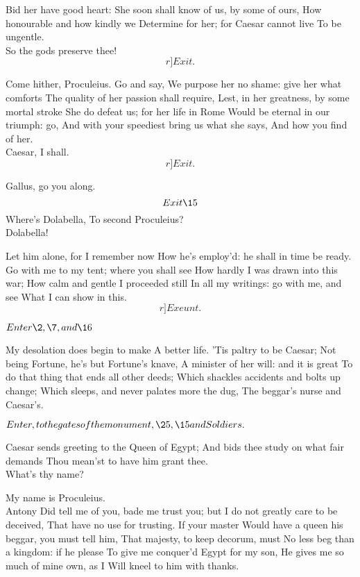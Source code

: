 \documentclass{book}
\begin{document}
\3	Bid her have good heart:
	She soon shall know of us, by some of ours,
	How honourable and how kindly we
	Determine for her; for Caesar cannot live
	To be ungentle. \\

	So the gods preserve thee!  \[r]Exit.\]

\3	Come hither, Proculeius. Go and say,
	We purpose her no shame: give her what comforts
	The quality of her passion shall require,
	Lest, in her greatness, by some mortal stroke
	She do defeat us; for her life in Rome
	Would be eternal in our triumph: go,
	And with your speediest bring us what she says,
	And how you find of her. \\

	Caesar, I shall. 	\[r]Exit.\]

\3	Gallus, go you along. \[Exit \15\] Where's Dolabella,
	To second Proculeius? \\

	Dolabella!

\3	Let him alone, for I remember now
	How he's employ'd: he shall in time be ready.
	Go with me to my tent; where you shall see
	How hardly I was drawn into this war;
	How calm and gentle I proceeded still
	In all my writings: go with me, and see
	What I can show in this. \[r]Exeunt.\]





	\(Enter \2, \7, and \16\)

\2	My desolation does begin to make
	A better life. 'Tis paltry to be Caesar;
	Not being Fortune, he's but Fortune's knave,
	A minister of her will: and it is great
	To do that thing that ends all other deeds;
	Which shackles accidents and bolts up change;
	Which sleeps, and never palates more the dug,
	The beggar's nurse and Caesar's.


	\(Enter, to the gates of the monument, \25, \15 and Soldiers.\)

	Caesar sends greeting to the Queen of Egypt;
	And bids thee study on what fair demands
	Thou mean'st to have him grant thee. \\

\2	What's thy name?

	My name is Proculeius. \\

\2	Antony
	Did tell me of you, bade me trust you; but
	I do not greatly care to be deceived,
	That have no use for trusting. If your master
	Would have a queen his beggar, you must tell him,
	That majesty, to keep decorum, must
	No less beg than a kingdom: if he please
	To give me conquer'd Egypt for my son,
	He gives me so much of mine own, as I
	Will kneel to him with thanks. \\
\end{document}
